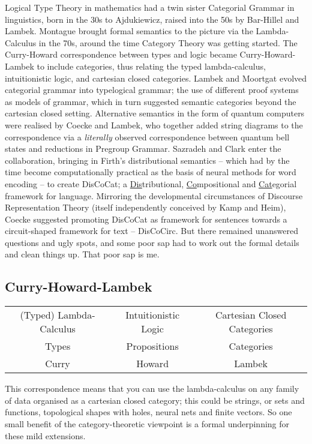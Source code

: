  Logical Type Theory in mathematics had a twin sister Categorial Grammar in linguistics, born in the 30s to Ajdukiewicz, raised into the 50s by Bar-Hillel and Lambek. Montague brought formal semantics to the picture via the Lambda-Calculus in the 70s, around the time Category Theory was getting started. The Curry-Howard correspondence between types and logic became Curry-Howard-Lambek to include categories, thus relating the typed lambda-calculus, intuitionistic logic, and cartesian closed categories. Lambek and Moortgat evolved categorial grammar into typelogical grammar; the use of different proof systems as models of grammar, which in turn suggested semantic categories beyond the cartesian closed setting. Alternative semantics in the form of quantum computers were realised by Coecke and Lambek, who together added string diagrams to the correspondence via a \emph{literally} observed correspondence between quantum bell states and reductions in Pregroup Grammar. Sazradeh and Clark enter the collaboration, bringing in Firth's distributional semantics -- which had by the time become computationally practical as the basis of neural methods for word encoding -- to create DisCoCat; a \underline{Dis}tributional, \underline{Co}mpositional and \underline{Cat}egorial framework for language. Mirroring the developmental circumstances of Discourse Representation Theory (itself independently conceived by Kamp and Heim), Coecke suggested promoting DisCoCat as framework for sentences towards a circuit-shaped framework for text -- DisCoCirc. But there remained unanswered questions and ugly spots, and some poor sap had to work out the formal details and clean things up. That poor sap is me.


\subsection{Curry-Howard-Lambek}

\begin{table}[]
\begin{tabular}{ccc}
(Typed) Lambda-Calculus & Intuitionistic Logic & Cartesian Closed Categories  \\
 Types & Propositions & Categories  \\
 Curry & Howard & Lambek 
\end{tabular}
\end{table}

This correspondence means that you can use the lambda-calculus on any family of data organised as a cartesian closed category; this could be strings, or sets and functions, topological shapes with holes, neural nets and finite vectors. So one small benefit of the category-theoretic viewpoint is a formal underpinning for these mild extensions.\\


